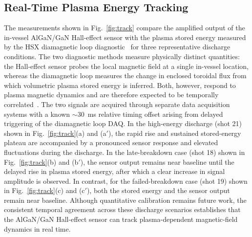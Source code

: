\documentclass{IEEE_lsens}
\begin{document}
\subsection{Real-Time Plasma Energy Tracking}
The measurements shown in Fig.~\ref{fig:track} compare the amplified output of the in-vessel AlGaN/GaN Hall-effect sensor with the plasma stored energy measured by the HSX diamagnetic loop diagnostic~\cite{ref16} for three representative discharge conditions. The two diagnostic methods measure physically distinct quantities: the Hall-effect sensor probes the local magnetic field at a single in-vessel location, whereas the diamagnetic loop measures the change in enclosed toroidal flux from which volumetric plasma stored energy is inferred. Both, however, respond to plasma magnetic dynamics and are therefore expected to be temporally correlated~\cite{ref1}. The two signals are acquired through separate data acquisition systems with a known $\sim$\SI{30}{\milli\second} relative timing offset arising from delayed triggering of the diamagnetic loop DAQ. In the high-energy discharge (shot 21) shown in Fig.~\ref{fig:track}(a) and (a$'$), the rapid rise and sustained stored-energy plateau are accompanied by a pronounced sensor response and elevated fluctuations during the discharge. In the late-breakdown case (shot 18) shown in Fig.~\ref{fig:track}(b) and (b$'$), the sensor output remains near baseline until the delayed rise in plasma stored energy, after which a clear increase in signal amplitude is observed. In contrast, for the failed-breakdown case (shot 19) shown in Fig.~\ref{fig:track}(c) and (c$'$), both the stored energy and the sensor output remain near baseline. Although quantitative calibration remains future work, the consistent temporal agreement across these discharge scenarios establishes that the AlGaN/GaN Hall-effect sensor can track plasma-dependent magnetic-field dynamics in real time.
\end{document}
